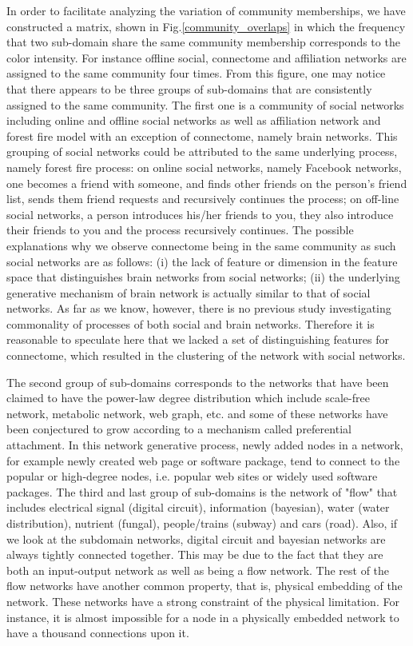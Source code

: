 In order to facilitate analyzing the variation of community memberships, we have constructed a matrix, shown in Fig.\ref{community_overlaps} in which the frequency that two sub-domain share the same community membership corresponds to the color intensity. For instance offline social, connectome and affiliation networks are assigned to the same community four times. From this figure, one may notice that there appears to be three groups of sub-domains that are consistently assigned to the same community. The first one is a community of social networks including online and offline social networks as well as affiliation network and forest fire model with an exception of connectome, namely brain networks. This grouping of social networks could be attributed to the same underlying process, namely forest fire process: on online social networks, namely Facebook networks, one becomes a friend with someone, and finds other friends on the person's friend list, sends them friend requests and recursively continues the process; on off-line social networks, a person introduces his/her friends to you, they also introduce their friends to you and the process recursively continues. The possible explanations why we observe connectome being in the same community as such social networks are as follows: (i) the lack of feature or dimension in the feature space that distinguishes brain networks from social networks; (ii) the underlying generative mechanism of brain network is actually similar to that of social networks. As far as we know, however, there is no previous study investigating commonality of processes of both social and brain networks. Therefore it is reasonable to speculate here that we lacked a set of distinguishing features for connectome, which resulted in the clustering of the network with social networks.

The second group of sub-domains corresponds to the networks that have been claimed to have the power-law degree distribution which include scale-free network, metabolic network, web graph, etc. and some of these networks have been conjectured to grow according to a mechanism called preferential attachment. In this network generative process, newly added nodes in a network, for example newly created web page or software package, tend to connect to the popular or high-degree nodes, i.e. popular web sites or widely used software packages. The third and last group of sub-domains is the network of "flow" that includes electrical signal (digital circuit), information (bayesian), water (water distribution), nutrient (fungal), people/trains (subway) and cars (road).  Also, if we look at the subdomain networks, digital circuit and bayesian networks are always tightly connected together. This may be due to the fact that they are both an input-output network as well as being a flow network. The rest of the flow networks have another common property, that is, physical embedding of the network. These networks have a strong constraint of the physical limitation. For instance, it is almost impossible for a node in a physically embedded network to have a thousand connections upon it.

